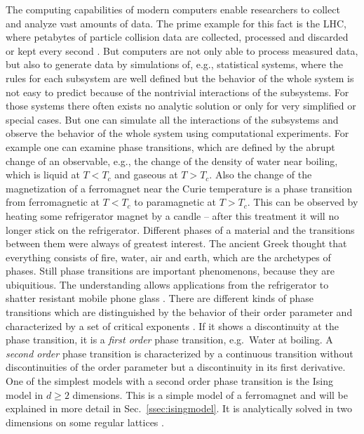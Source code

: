The computing capabilities of modern computers enable researchers to
collect and analyze vast amounts of data. The prime example for this fact
is the LHC, where petabytes of particle collision data are collected,
processed and discarded or kept every second \cite{LHC}.
But computers are not only able to process measured data, but
also to generate data by simulations of, e.g., statistical systems, where
the rules for each subsystem are well defined but the behavior of the
whole system is not easy to predict because of the nontrivial interactions of the
subsystems. For those systems there often exists no analytic solution
or only for very simplified or special cases. But one can simulate all
the interactions of the subsystems and observe the behavior of the whole
system using computational experiments.
For example one can examine phase transitions, which are defined by the abrupt
change of an observable, e.g., the change of the density of water near
boiling, which is liquid at \(T < T_c\) and gaseous at \(T > T_c\). Also
the change of the magnetization of a ferromagnet near the Curie temperature
is a phase transition from ferromagnetic at \(T < T_c\) to paramagnetic at \(T > T_c\).
This can be observed by heating some refrigerator magnet by a candle --
after this treatment it will no longer stick on the refrigerator.
Different phases of a material and the transitions between them were
always of greatest interest. The ancient Greek thought that everything
consists of fire, water, air and earth, which are the archetypes of
phases. Still phase transitions are important phenomenons, because they
are ubiquitious. The understanding allows applications from the
refrigerator to shatter resistant mobile phone glass \cite{PJournalGlass}.
There are different kinds of phase transitions which are distinguished by
the behavior of their order parameter and characterized by a set of
critical exponents \cite{yeomans}. If it shows a discontinuity at
the phase transition, it is a \emph{first order} phase transition, e.g.\ Water at boiling.
A \emph{second order} phase transition is characterized by a continuous
transition without discontinuities of the order parameter but a discontinuity
in its first derivative.\\
One of the simplest models with a second order phase transition is the
Ising model \cite{Ising1925} in \(d \ge 2\) dimensions. This is a simple
model of a ferromagnet and will be explained in more detail in Sec.\
\ref{ssec:isingmodel}. It is analytically solved in two dimensions on
some regular lattices \cite{Onsager1944} \cite{Wannier1945}.
